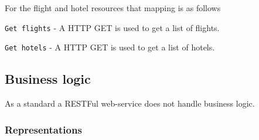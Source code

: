 For the flight and hotel resources that mapping is as follows
\begin{description}
	\item \texttt{Get flights} - A HTTP GET is used to get a list of flights.
	\item \texttt{Get hotels} - A HTTP GET is used to get a list of hotels.	
\end{description}

\subsection{Business logic}
As a standard a RESTFul web-service does not handle business logic.
\subsubsection{Representations}

